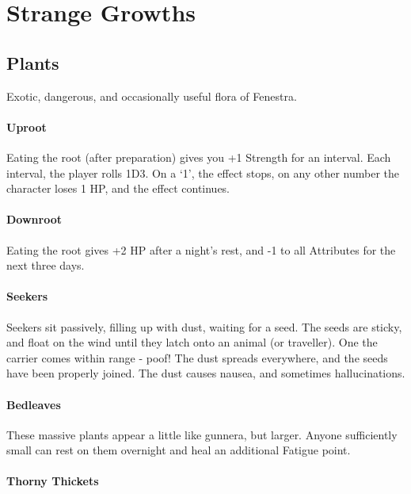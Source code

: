 \chapter{Strange Growths}
\label{plants}

\section{Plants}

\begin{multicols}{2}

Exotic, dangerous, and occasionally useful flora of Fenestra.

\subsubsection{Uproot}
\label{uproot}

Eating the root (after preparation) gives you +1 Strength for an interval.
Each interval, the player rolls 1D3.
On a `1', the effect stops, on any other number the character loses 1 HP, and the effect continues.

\subsubsection{Downroot}
\label{downroot}

Eating the root gives +2 HP after a night's rest, and -1 to all Attributes for the next three days.

\subsubsection{Seekers}
\label{seekers}

Seekers sit passively, filling up with dust, waiting for a seed.
The seeds are sticky, and float on the wind until they latch onto an animal (or traveller).
One the carrier comes within range - poof!
The dust spreads everywhere, and the seeds have been properly joined.
The dust causes nausea, and sometimes hallucinations.

\subsubsection{Bedleaves}
\label{bedleaves}

These massive plants appear a little like gunnera, but larger.
Anyone sufficiently small can rest on them overnight and heal an additional Fatigue point.

\subsubsection{Thorny Thickets}
\label{thorny_thickets}


\end{multicols}
